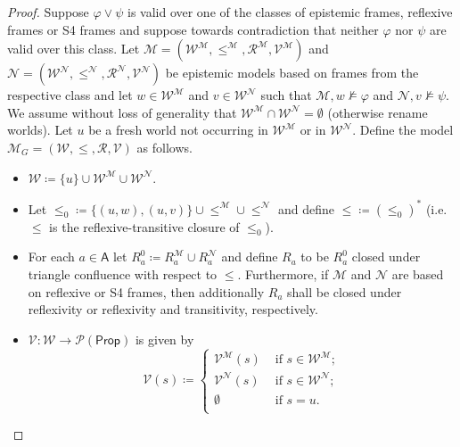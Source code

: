 \documentclass{myifcolog}
\newcommand\Prop {\mathsf{Prop}}
\newcommand\A{\mathsf{A}}
\newcommand{\agi}{a}
\newcommand{\fw}{\mathcal{M}}
\newcommand{\fv}{\mathcal{N}}
\newcommand{\W}{\mathcal{W}}
\newcommand{\rel}{\mathcal{R}}
\newcommand{\V}{\mathcal{V}}
\numberwithin{theorem}{section}
\begin{document}
\begin{proof}
    Suppose $\varphi \vee \psi$ is valid over one of the classes of epistemic frames, reflexive frames or S4 frames and suppose towards contradiction that neither $\varphi$ nor $\psi$ are valid over this class. Let $\fw =(\W^\fw, \leq^\fw, \rel^\fw, \V^\fw)$ and $\fv =(\W^\fv, \leq^\fv, \rel^\fv, \V^\fv)$ be epistemic models based on frames from the respective class and let $w \in \W^\fw$ and $v \in \W^\fv$ such that $\fw, w \not \models \varphi$ and $\fv, v \not \models \psi$. We assume without loss of generality that $\W^\fw \cap \W^\fv = \emptyset$ (otherwise rename worlds). Let $u$ be a fresh world not occurring in $\W^\fw$ or in $\W^\fv$. Define the model $\fw_G =(\W, \leq, \rel, \V)$ as follows.
    \begin{itemize} 
        \item $\W \coloneqq \{u\} \cup \W^\fw \cup \W^\fv$.
        \item Let $\leq_0 \coloneqq \{(u,w), (u,v)\} \cup \leq^\fw \cup \leq^\fv$ and define $\leq \coloneqq (\leq_0)^\ast$ (i.e. $\leq$ is the reflexive-transitive closure of $\leq_0$).
        \item For each $\agi \in \A$ let $R_\agi^0 \coloneqq R_\agi^\fw \cup R_\agi^\fv$ and define $R_\agi$ to be $R_\agi^0$ closed under triangle confluence with respect to $\leq$. Furthermore, if $\fw$ and $\fv$ are based on reflexive or S4 frames, then additionally $R_\agi$ shall be closed under reflexivity or reflexivity and transitivity, respectively.
        \item $\V: \W \longrightarrow \mathcal{P}(\Prop)$ is given by
        \begin{equation*}
            \V(s)  \coloneqq
            \begin{cases}
                 \V^\fw(s) &\text{ if } s \in \W^\fw; \\
                \V^\fv(s) &\text{ if } s \in \W^\fv; \\
                \emptyset & \text{ if } s= u. \\
            \end{cases}
        \end{equation*}
    \end{itemize}

\end{proof}
\end{document}
